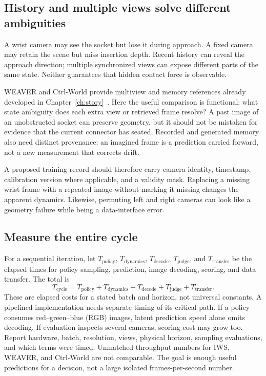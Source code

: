 \subsection{History and multiple views solve different ambiguities}
A wrist camera may see the socket but lose it during approach. A fixed camera may retain the scene but miss insertion depth. Recent history can reveal the approach direction; multiple synchronized views can expose different parts of the same state. Neither guarantees that hidden contact force is observable.

WEAVER and Ctrl-World provide multiview and memory references already developed in Chapter~\ref{ch:story}~\citep{weaver,ctrl}. Here the useful comparison is functional: what state ambiguity does each extra view or retrieved frame resolve? A past image of an unobstructed socket can preserve geometry, but it should not be mistaken for evidence that the current connector has seated. Recorded and generated memory also need distinct provenance: an imagined frame is a prediction carried forward, not a new measurement that corrects drift.

A proposed training record should therefore carry camera identity, timestamp, calibration version where applicable, and a validity mask. Replacing a missing wrist frame with a repeated image without marking it missing changes the apparent dynamics. Likewise, permuting left and right cameras can look like a geometry failure while being a data-interface error.

\subsection{Measure the entire cycle}
For a sequential iteration, let $T_{\mathrm{policy}}$, $T_{\mathrm{dynamics}}$, $T_{\mathrm{decode}}$, $T_{\mathrm{judge}}$, and $T_{\mathrm{transfer}}$ be the elapsed times for policy sampling, prediction, image decoding, scoring, and data transfer. The total is
\begin{equation}
 T_{\mathrm{cycle}}=T_{\mathrm{policy}}+T_{\mathrm{dynamics}}+
 T_{\mathrm{decode}}+T_{\mathrm{judge}}+T_{\mathrm{transfer}}.
 \label{eq:middle-cost}
\end{equation}
These are elapsed costs for a stated batch and horizon, not universal constants. A pipelined implementation needs separate timing of its critical path. If a policy consumes red--green--blue (RGB) images, latent prediction speed alone omits decoding. If evaluation inspects several cameras, scoring cost may grow too. Report hardware, batch, resolution, views, physical horizon, sampling evaluations, and which terms were timed. Unmatched throughput numbers for IWS, WEAVER, and Ctrl-World are not comparable. The goal is enough useful predictions for a decision, not a large isolated frames-per-second number.

